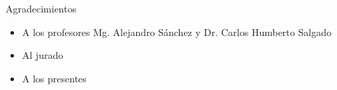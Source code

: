 \documentclass[10pt]{beamer}
\begin{document}
\begin{frame}{Agradecimientos}
    \begin{itemize}
        \item A los profesores Mg. Alejandro Sánchez y Dr. Carlos Humberto Salgado
        \item Al jurado
        \item A los presentes
    \end{itemize}
\end{frame}

\end{document}
